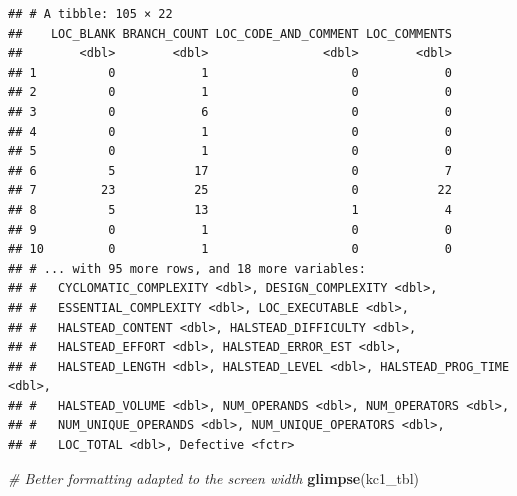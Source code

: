 \documentclass[]{book}
\newenvironment{Shaded}{\begin{snugshade}}{\end{snugshade}}
\newcommand{\KeywordTok}[1]{\textcolor[rgb]{0.13,0.29,0.53}{\textbf{{#1}}}}
\newcommand{\CommentTok}[1]{\textcolor[rgb]{0.56,0.35,0.01}{\textit{{#1}}}}
\newcommand{\NormalTok}[1]{{#1}}
\begin{document}
\begin{verbatim}
## # A tibble: 105 × 22
##    LOC_BLANK BRANCH_COUNT LOC_CODE_AND_COMMENT LOC_COMMENTS
##        <dbl>        <dbl>                <dbl>        <dbl>
## 1          0            1                    0            0
## 2          0            1                    0            0
## 3          0            6                    0            0
## 4          0            1                    0            0
## 5          0            1                    0            0
## 6          5           17                    0            7
## 7         23           25                    0           22
## 8          5           13                    1            4
## 9          0            1                    0            0
## 10         0            1                    0            0
## # ... with 95 more rows, and 18 more variables:
## #   CYCLOMATIC_COMPLEXITY <dbl>, DESIGN_COMPLEXITY <dbl>,
## #   ESSENTIAL_COMPLEXITY <dbl>, LOC_EXECUTABLE <dbl>,
## #   HALSTEAD_CONTENT <dbl>, HALSTEAD_DIFFICULTY <dbl>,
## #   HALSTEAD_EFFORT <dbl>, HALSTEAD_ERROR_EST <dbl>,
## #   HALSTEAD_LENGTH <dbl>, HALSTEAD_LEVEL <dbl>, HALSTEAD_PROG_TIME <dbl>,
## #   HALSTEAD_VOLUME <dbl>, NUM_OPERANDS <dbl>, NUM_OPERATORS <dbl>,
## #   NUM_UNIQUE_OPERANDS <dbl>, NUM_UNIQUE_OPERATORS <dbl>,
## #   LOC_TOTAL <dbl>, Defective <fctr>
\end{verbatim}

\begin{Shaded}
\begin{Highlighting}[]
\CommentTok{# Better formatting adapted to the screen width}
\KeywordTok{glimpse}\NormalTok{(kc1_tbl)}
\end{Highlighting}
\end{Shaded}
\end{document}
